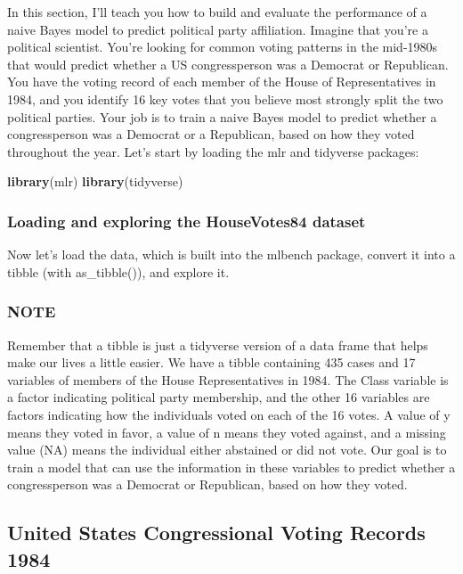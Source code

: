 \documentclass[
]{article}
\newenvironment{Shaded}{\begin{snugshade}}{\end{snugshade}}
\newcommand{\FunctionTok}[1]{\textcolor[rgb]{0.13,0.29,0.53}{\textbf{#1}}}
\newcommand{\NormalTok}[1]{#1}
\begin{document}
In this section, I'll teach you how to build and evaluate the
performance of a naive Bayes model to predict political party
affiliation. Imagine that you're a political scientist. You're looking
for common voting patterns in the mid-1980s that would predict whether a
US congressperson was a Democrat or Republican. You have the voting
record of each member of the House of Representatives in 1984, and you
identify 16 key votes that you believe most strongly split the two
political parties. Your job is to train a naive Bayes model to predict
whether a congressperson was a Democrat or a Republican, based on how
they voted throughout the year. Let's start by loading the mlr and
tidyverse packages:

\begin{Shaded}
\begin{Highlighting}[]
\FunctionTok{library}\NormalTok{(mlr)}
\FunctionTok{library}\NormalTok{(tidyverse)}
\end{Highlighting}
\end{Shaded}

\subsubsection{Loading and exploring the HouseVotes84
dataset}\label{loading-and-exploring-the-housevotes84-dataset}

Now let's load the data, which is built into the mlbench package,
convert it into a tibble (with as\_tibble()), and explore it.

\subsubsection{NOTE}\label{note-10}

Remember that a tibble is just a tidyverse version of a data frame that
helps make our lives a little easier. We have a tibble containing 435
cases and 17 variables of members of the House Representatives in 1984.
The Class variable is a factor indicating political party membership,
and the other 16 variables are factors indicating how the individuals
voted on each of the 16 votes. A value of y means they voted in favor, a
value of n means they voted against, and a missing value (NA) means the
individual either abstained or did not vote. Our goal is to train a
model that can use the information in these variables to predict whether
a congressperson was a Democrat or Republican, based on how they voted.

\subsection{United States Congressional Voting Records
1984}\label{united-states-congressional-voting-records-1984}
\end{document}
